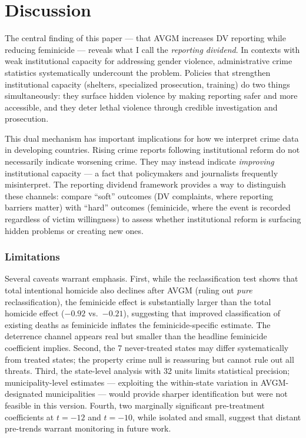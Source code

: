 \documentclass[12pt]{article}
\begin{document}



\section{Discussion}

The central finding of this paper --- that AVGM increases DV reporting while reducing feminicide --- reveals what I call the \textit{reporting dividend}. In contexts with weak institutional capacity for addressing gender violence, administrative crime statistics systematically undercount the problem. Policies that strengthen institutional capacity (shelters, specialized prosecution, training) do two things simultaneously: they surface hidden violence by making reporting safer and more accessible, and they deter lethal violence through credible investigation and prosecution.

This dual mechanism has important implications for how we interpret crime data in developing countries. Rising crime reports following institutional reform do not necessarily indicate worsening crime. They may instead indicate \textit{improving} institutional capacity --- a fact that policymakers and journalists frequently misinterpret. The reporting dividend framework provides a way to distinguish these channels: compare ``soft'' outcomes (DV complaints, where reporting barriers matter) with ``hard'' outcomes (feminicide, where the event is recorded regardless of victim willingness) to assess whether institutional reform is surfacing hidden problems or creating new ones.

\subsubsection*{Limitations} Several caveats warrant emphasis. First, while the reclassification test shows that total intentional homicide also declines after AVGM (ruling out \textit{pure} reclassification), the feminicide effect is substantially larger than the total homicide effect ($-0.92$ vs.\ $-0.21$), suggesting that improved classification of existing deaths as feminicide inflates the feminicide-specific estimate. The deterrence channel appears real but smaller than the headline feminicide coefficient implies. Second, the 7 never-treated states may differ systematically from treated states; the property crime null is reassuring but cannot rule out all threats. Third, the state-level analysis with 32 units limits statistical precision; municipality-level estimates --- exploiting the within-state variation in AVGM-designated municipalities --- would provide sharper identification but were not feasible in this version. Fourth, two marginally significant pre-treatment coefficients at $t = -12$ and $t = -10$, while isolated and small, suggest that distant pre-trends warrant monitoring in future work.
\end{document}
